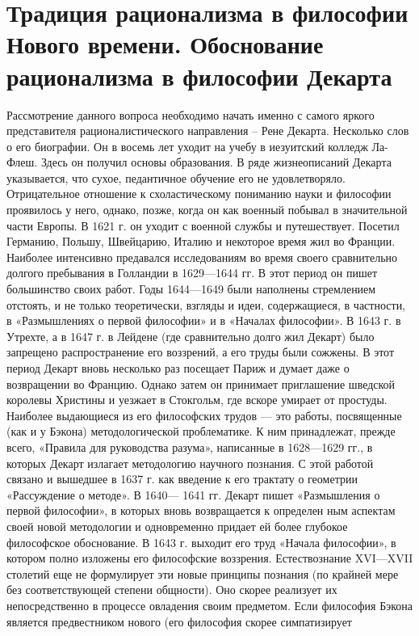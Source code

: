 \documentclass[12pt]{article}
\begin{document}
\section{Традиция рационализма в философии Нового времени. Обоснование рационализма в философии Декарта}
Рассмотрение данного вопроса необходимо начать именно с самого яркого представителя рационалистического
направления – Рене Декарта. Несколько слов о его биографии. Он в восемь лет уходит на учебу в иезуитский
колледж Ла-Флеш. Здесь он получил основы образования. В ряде жизнеописаний Декарта указывается, что
сухое, педантичное обучение его не удовлетворяло. Отрицательное отношение к схоластическому пониманию
науки и философии проявилось у него, однако, позже, когда он как военный побывал в значительной части
Европы. В 1621 г. он уходит с военной службы и путешествует. Посетил Германию, Польшу, Швейцарию,
Италию и некоторое время жил во Франции. Наиболее интенсивно предавался исследованиям во время своего
сравнительно долгого пребывания в Голландии в 1629—1644 гг. В этот период он пишет большинство своих
работ. Годы 1644—1649 были наполнены стремлением отстоять, и не только теоретически, взгляды и идеи,
содержащиеся, в частности, в «Размышлениях о первой философии» и в «Началах философии». В 1643 г. в
Утрехте, а в 1647 г. в Лейдене (где сравнительно долго жил Декарт) было запрещено распространение его
воззрений, а его труды были сожжены. В этот период Декарт вновь несколько раз посещает Париж и думает
даже о возвращении во Францию. Однако затем он принимает приглашение шведской королевы Христины и
уезжает в Стокгольм, где вскоре умирает от простуды.
Наиболее  выдающиеся  из  его  философских  трудов  —  это  работы,  посвященные  (как  и  у  Бэкона)
методологической  проблематике.  К  ним  принадлежат,  прежде  всего,  «Правила  для  руководства  разума»,
написанные в 1628—1629 гг., в которых Декарт излагает методологию научного познания. С этой работой
связано и вышедшее в 1637 г. как введение к его трактату о геометрии «Рассуждение о методе». В 1640— 1641
гг.  Декарт  пишет  «Размышления  о  первой  философии»,  в  которых  вновь  возвращается  к  определен ным
аспектам своей новой методологии и одновременно придает ей более глубокое философское обоснование. В
1643 г. выходит его труд «Начала философии», в котором полно изложены его философские воззрения.
Естествознание XVI—XVII столетий еще не формулирует эти новые принципы познания (по крайней мере без
соответствующей степени общности). Оно скорее реализует их непосредственно в процессе овладения своим
предметом. Если философия  Бэкона является  предвестником  нового (его  философия скорее  симпатизирует
\end{document}

